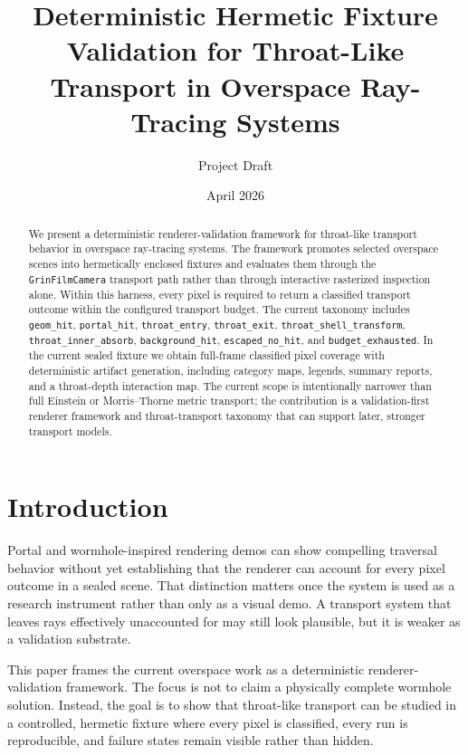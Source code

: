 \documentclass[11pt]{article}
\title{Deterministic Hermetic Fixture Validation for Throat-Like Transport in Overspace Ray-Tracing Systems}
\author{Project Draft}
\date{April 2026}
\begin{document}
\maketitle

\begin{abstract}
We present a deterministic renderer-validation framework for throat-like transport behavior in overspace ray-tracing systems. The framework promotes selected overspace scenes into hermetically enclosed fixtures and evaluates them through the \texttt{GrinFilmCamera} transport path rather than through interactive rasterized inspection alone. Within this harness, every pixel is required to return a classified transport outcome within the configured transport budget. The current taxonomy includes \texttt{geom\_hit}, \texttt{portal\_hit}, \texttt{throat\_entry}, \texttt{throat\_exit}, \texttt{throat\_shell\_transform}, \texttt{throat\_inner\_absorb}, \texttt{background\_hit}, \texttt{escaped\_no\_hit}, and \texttt{budget\_exhausted}. In the current sealed fixture we obtain full-frame classified pixel coverage with deterministic artifact generation, including category maps, legends, summary reports, and a throat-depth interaction map. The current scope is intentionally narrower than full Einstein or Morris--Thorne metric transport; the contribution is a validation-first renderer framework and throat-transport taxonomy that can support later, stronger transport models.
\end{abstract}

\section{Introduction}
Portal and wormhole-inspired rendering demos can show compelling traversal behavior without yet establishing that the renderer can account for every pixel outcome in a sealed scene. That distinction matters once the system is used as a research instrument rather than only as a visual demo. A transport system that leaves rays effectively unaccounted for may still look plausible, but it is weaker as a validation substrate.

This paper frames the current overspace work as a deterministic renderer-validation framework. The focus is not to claim a physically complete wormhole solution. Instead, the goal is to show that throat-like transport can be studied in a controlled, hermetic fixture where every pixel is classified, every run is reproducible, and failure states remain visible rather than hidden.
\end{document}
